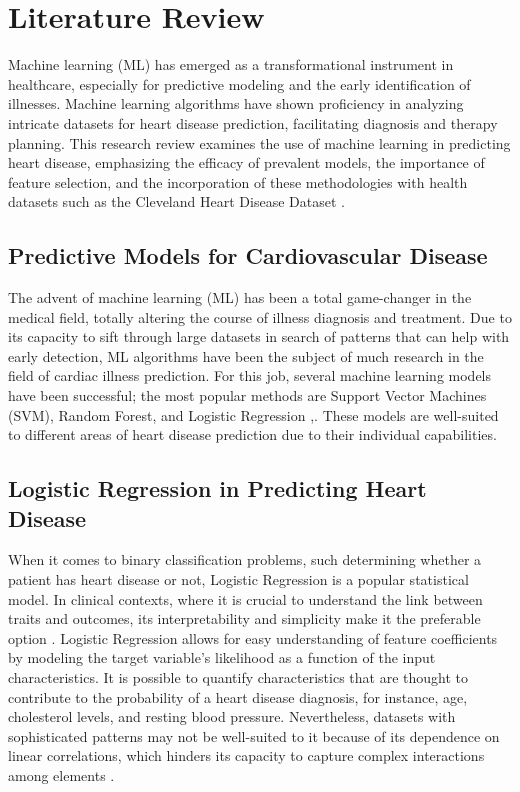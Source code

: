 \section{Literature Review}

Machine learning (ML) has emerged as a transformational instrument in healthcare, especially for predictive modeling and the early identification of illnesses. Machine learning algorithms have shown proficiency in analyzing intricate datasets for heart disease prediction, facilitating diagnosis and therapy planning. This research review examines the use of machine learning in predicting heart disease, emphasizing the efficacy of prevalent models, the importance of feature selection, and the incorporation of these methodologies with health datasets such as the Cleveland Heart Disease Dataset \cite{battineni2020diagnosis}.

\subsection{Predictive Models for Cardiovascular Disease}

The advent of machine learning (ML) has been a total game-changer in the medical field, totally altering the course of illness diagnosis and treatment. Due to its capacity to sift through large datasets in search of patterns that can help with early detection, ML algorithms have been the subject of much research in the field of cardiac illness prediction. For this job, several machine learning models have been successful; the most popular methods are Support Vector Machines (SVM), Random Forest, and Logistic Regression \cite{zhou2021machine},\cite{ren2017forest}. These models are well-suited to different areas of heart disease prediction due to their individual capabilities.

\subsection{Logistic Regression in Predicting Heart Disease}
When it comes to binary classification problems, such determining whether a patient has heart disease or not, Logistic Regression is a popular statistical model. In clinical contexts, where it is crucial to understand the link between traits and outcomes, its interpretability and simplicity make it the preferable option \cite{battineni2020diagnosis}. Logistic Regression allows for easy understanding of feature coefficients by modeling the target variable's likelihood as a function of the input characteristics. It is possible to quantify characteristics that are thought to contribute to the probability of a heart disease diagnosis, for instance, age, cholesterol levels, and resting blood pressure. Nevertheless, datasets with sophisticated patterns may not be well-suited to it because of its dependence on linear correlations, which hinders its capacity to capture complex interactions among elements \cite{zhou2021machine}.

